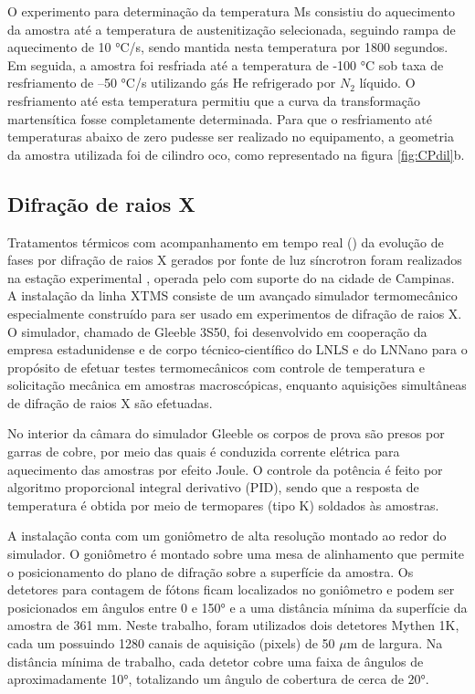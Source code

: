 O experimento para determinação da temperatura Ms consistiu do aquecimento da amostra até a temperatura de austenitização selecionada, seguindo rampa de aquecimento de 10 °C/s, sendo mantida nesta temperatura por 1800 segundos. Em seguida, a amostra foi resfriada até a temperatura de -100 °C sob taxa de resfriamento de --50 °C/s utilizando gás He refrigerado por $N_2$ líquido. O resfriamento até esta temperatura permitiu que a curva da transformação martensítica fosse completamente determinada. Para que o resfriamento até temperaturas abaixo de zero pudesse ser realizado no equipamento, a geometria da amostra utilizada foi de cilindro oco, como representado na figura \ref{fig:CPdil}b.

\subsection{Difra\c{c}\~{a}o de raios X }

Tratamentos térmicos com acompanhamento em tempo real () da evolução de fases por difração de raios X gerados por fonte de luz síncrotron foram realizados na estação experimental , operada pelo  com suporte do  na cidade de Campinas. A instalação da linha XTMS consiste de um avançado simulador termomecânico especialmente construído para ser usado em experimentos de difração de raios X. O simulador, chamado de Gleeble\textregistered{} 3S50, foi desenvolvido em cooperação da empresa estadunidense  e de corpo técnico-científico do LNLS e do LNNano para o propósito de efetuar testes termomecânicos com controle de temperatura e solicitação mecânica em amostras macroscópicas, enquanto aquisições simultâneas de difração de raios X são efetuadas. %

No interior da câmara do simulador Gleeble os corpos de prova são presos por garras de cobre, por meio das quais é conduzida corrente elétrica para aquecimento das amostras por efeito Joule. O controle da potência é feito por algoritmo proporcional integral derivativo (PID), sendo que a resposta de temperatura é obtida por meio de termopares (tipo K) soldados às amostras.

A instalação conta com um goniômetro de alta resolução montado ao redor do simulador. O goniômetro é montado sobre uma mesa de alinhamento que permite o posicionamento do plano de difração sobre a superfície da amostra. Os detetores para contagem de fótons ficam localizados no goniômetro e podem ser posicionados em ângulos entre 0 e 150° e a uma distância mínima da superfície da amostra de 361 mm. Neste trabalho, foram utilizados dois detetores Mythen 1K, cada um possuindo 1280 canais de aquisição (pixels) de 50 $\mu$m de largura. Na distância mínima de trabalho, cada detetor cobre uma faixa de ângulos de aproximadamente 10°, totalizando um ângulo de cobertura de cerca de 20°.

